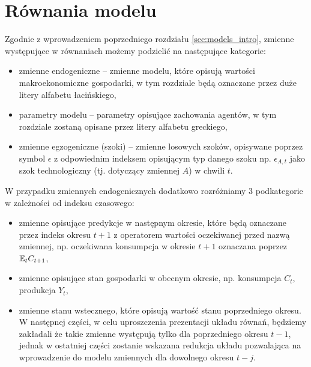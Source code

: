         \resizebox{\columnwidth}{!}{%

        }


\section{Równania modelu}

Zgodnie z wprowadzeniem poprzedniego rozdziału \ref{sec:models_intro}, zmienne występujące w równaniach możemy podzielić na następujące kategorie:
\begin{itemize}
    \item zmienne endogeniczne -- zmienne modelu, które opisują wartości makroekonomiczne gospodarki, w tym rozdziale będą oznaczane przez duże litery alfabetu łacińskiego,
    \item parametry modelu -- parametry opisujące zachowania agentów, w tym rozdziale zostaną opisane przez litery alfabetu greckiego,
    \item zmienne egzogeniczne (szoki) -- zmienne losowych szoków, opisywane poprzez symbol $\epsilon$ z odpowiednim indeksem opisującym typ danego szoku np. $\epsilon_{A,t}$ jako szok technologiczny (tj. dotyczący zmiennej $A$) w chwili $t$.
\end{itemize}
W przypadku zmiennych endogenicznych dodatkowo rozróżniamy 3 podkategorie w zależności od indeksu czasowego:
\begin{itemize}
    \item zmienne opisujące predykcje w następnym okresie, które będą oznaczane przez indeks okresu $t+1$ z operatorem wartości oczekiwanej przed nazwą zmiennej, np. oczekiwana konsumpcja w okresie $t+1$ oznaczana poprzez $\mathbb{E}_t C_{t+1}$,
    \item zmienne opisujące stan gospodarki w obecnym okresie, np. konsumpcja $C_t$, produkcja $Y_t$,
    \item zmienne stanu wstecznego, które opisują wartość stanu poprzedniego okresu. W następnej części, w celu uproszczenia prezentacji układu równań, będziemy zakładali że takie zmienne występują tylko dla poprzedniego okresu $t-1$, jednak w ostatniej części zostanie wskazana redukcja układu pozwalająca na wprowadzenie do modelu zmiennych dla dowolnego okresu $t-j$.
\end{itemize}

